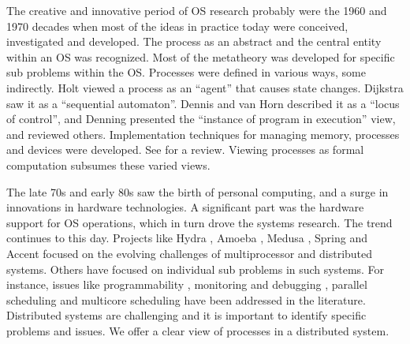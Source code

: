 \documentclass[draft]{article}
\begin{document}
The creative  and innovative period  of OS research probably  were the
1960 and  1970 decades when most  of the ideas in  practice today were
conceived, investigated and developed.  The process as an abstract and
the  central  entity  within  an  OS  was  recognized.   Most  of  the
metatheory  was developed  for specific  sub problems  within  the OS.
Processes  were  defined  in  various  ways,  some  indirectly.   Holt
\cite{Holt:1972:DPC:850614.850627}  viewed a  process as  an ``agent''
that          causes         state          changes.          Dijkstra
\cite{Dijkstra:1968:SLS:363095.363143}   saw  it  as   a  ``sequential
automaton''.  Dennis and van Horn \cite{Dennis:1966:PSM:365230.365252}
described   it    as   a    ``locus   of   control'',    and   Denning
\cite{Denning:1971:TGC:356593.356595}  presented   the  ``instance  of
program  in  execution'' view,  and  reviewed others.   Implementation
techniques for managing memory,  processes and devices were developed.
See  \cite{Denning:1971:TGC:356593.356595}   for  a  review.   Viewing
processes as formal computation subsumes these varied views.

The late 70s and early 80s  saw the birth of personal computing, and a
surge in innovations in hardware technologies.  A significant part was
the  hardware support  for  OS  operations, which  in  turn drove  the
systems  research.  The trend  continues to  this day.   Projects like
Hydra            \cite{Wulf:1975:OHO:1067629.806530},           Amoeba
\cite{Tanenbaum:1990:EAD:96267.96281},                           Medusa
\cite{Ousterhout:1980:MED:358818.358823},                        Spring
\cite{Stankovic:1989:SKN:71021.71024}            and            Accent
\cite{Rashid:1981:ACO:800216.806593}    focused   on    the   evolving
challenges  of multiprocessor  and distributed  systems.   Others have
focused  on individual sub  problems in  such systems.   For instance,
issues   like   programmability   \cite{Marques:1989:EOS:74877.74890},
monitoring and  debugging \cite{Tokuda:1988:RMD:68210.69222}, parallel
scheduling    \cite{Narang:2011:PDM:2007183.2007186}   and   multicore
scheduling    \cite{Shelepov:2009:HSH:1531793.1531804}    have    been
addressed               in               the               literature.
Distributed systems are challenging and it is
important to identify specific problems  and issues.  We offer a clear
view of processes in a distributed system.
\end{document}
